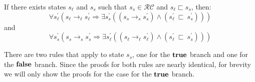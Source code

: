 \begin{lemma}
\label{lem:compare}
If there exists states $s_\ell$ and $s_s$ such that $s_s \in \mathcal{RC}$ and $s_\ell \sqsubset s_s$, then:
\begin{equation}
\forall s_\ell^\prime ( s_\ell \rightarrow_\ell s_\ell^\prime \Rightarrow \exists s_s^\prime( (s_s \rightarrow_s s_s^\prime )\wedge (s_\ell^\prime\ \sqsubset\ s_s^\prime ))  )
\end{equation}
and
\begin{equation}
\forall s_s^\prime ( s_s \rightarrow_s s_s^\prime\Rightarrow \exists s_\ell^\prime( (s_\ell \rightarrow_\ell s_\ell^\prime )\wedge (s_\ell^\prime\ \sqsubset\ s_s^\prime ))  )
\end{equation}
\end{lemma}
There are two rules that apply to state $s_s$, one for the $\textbf{true}$ branch and one for the $\textbf{false}$ branch. Since the proofs for both rules are nearly identical, for brevity we will only show the proofs for the case for the $\textbf{true}$ branch. 
